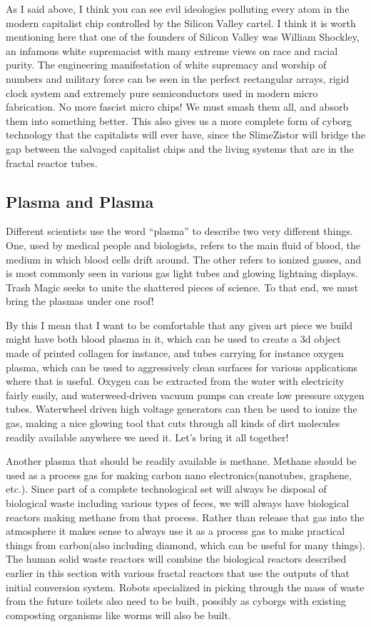 As I said above, I think you can see evil ideologies polluting every
atom in the modern capitalist chip controlled by the Silicon Valley
cartel. I think it is worth mentioning here that one of the founders of
Silicon Valley was William Shockley, an infamous white supremacist with
many extreme views on race and racial purity. The engineering
manifestation of white supremacy and worship of numbers and military
force can be seen in the perfect rectangular arrays, rigid clock system
and extremely pure semiconductors used in modern micro fabrication. No
more fascist micro chips! We must smash them all, and absorb them into
something better. This also gives us a more complete form of cyborg
technology that the capitalists will ever have, since the SlimeZistor
will bridge the gap between the salvaged capitalist chips and the living
systems that are in the fractal reactor tubes.

\subsection{Plasma and Plasma}\label{plasma-and-plasma}

Different scientists use the word ``plasma'' to describe two very
different things. One, used by medical people and biologists, refers to
the main fluid of blood, the medium in which blood cells drift around.
The other refers to ionized gasses, and is most commonly seen in various
gas light tubes and glowing lightning displays. Trash Magic seeks to
unite the shattered pieces of science. To that end, we must bring the
plasmas under one roof!

By this I mean that I want to be comfortable that any given art piece we
build might have both blood plasma in it, which can be used to create a
3d object made of printed collagen for instance, and tubes carrying for
instance oxygen plasma, which can be used to aggressively clean surfaces
for various applications where that is useful. Oxygen can be extracted
from the water with electricity fairly easily, and waterweed-driven
vacuum pumps can create low pressure oxygen tubes. Waterwheel driven
high voltage generators can then be used to ionize the gas, making a
nice glowing tool that cuts through all kinds of dirt molecules readily
available anywhere we need it. Let's bring it all together!

Another plasma that should be readily available is methane. Methane
should be used as a process gas for making carbon nano
electronics(nanotubes, graphene, etc.). Since part of a complete
technological set will always be disposal of biological waste including
various types of feces, we will always have biological reactors making
methane from that process. Rather than release that gas into the
atmosphere it makes sense to always use it as a process gas to make
practical things from carbon(also including diamond, which can be useful
for many things). The human solid waste reactors will combine the
biological reactors described earlier in this section with various
fractal reactors that use the outputs of that initial conversion system.
Robots specialized in picking through the mass of waste from the future
toilets also need to be built, possibly as cyborgs with existing
composting organisms like worms will also be built.

